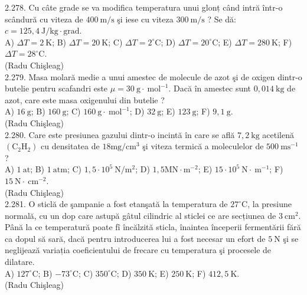 2.278. Cu câte grade se va modifica temperatura unui glonț când intră într-o scândură cu viteza de $400 \mathrm{~m} / \mathrm{s}$ şi iese cu viteza $300 \mathrm{~m} / \mathrm{s}$ ? Se dă: $c=125,4 \mathrm{~J} / \mathrm{kg} \cdot \mathrm{grad}$.\\ A) $\Delta T=2 \mathrm{~K}$; B) $\Delta T=20 \mathrm{~K}$; C) $\Delta T=2^{\circ} \mathrm{C}$; D) $\Delta T=20^{\circ} \mathrm{C}$; E) $\Delta T=280 \mathrm{~K}$; F) $\Delta T=28^{\circ} \mathrm{C}$.\\ (Radu Chişleag)\\

2.279. Masa molară medie a unui amestec de molecule de azot şi de oxigen dintr-o butelie pentru scafandri este $\mu=30 \mathrm{~g} \cdot \mathrm{~mol}^{-1}$. Dacă în amestec sunt $0,014 \mathrm{~kg}$ de azot, care este masa oxigenului din butelie ?\\ A) $16 \mathrm{~g}$; B) $160 \mathrm{~g}$; C) $160 \mathrm{~g} \cdot \mathrm{~mol}^{-1}$; D) $32 \mathrm{~g}$; E) $123 \mathrm{~g}$; F) $9,1 \mathrm{~g}$.\\ (Radu Chişleag)\\

2.280. Care este presiunea gazului dintr-o incintă în care se află $7,2 \mathrm{~kg}$ acetilenă $\left(\mathrm{C}_{2} \mathrm{H}_{2}\right)$ cu densitatea de $18 \mathrm{mg} / \mathrm{cm}^{3}$ şi viteza termică a moleculelor de $500 \mathrm{~ms}^{-1}$ ?\\ A) $1 \mathrm{~at}$; B) $1 \mathrm{~atm}$; C) $1,5 \cdot 10^{5} \mathrm{~N} / \mathrm{m}^{2}$; D) $1,5 \mathrm{MN} \cdot \mathrm{m}^{-2}$; E) $15 \cdot 10^{5} \mathrm{~N} \cdot \mathrm{~m}^{-1}$; F) $15 \mathrm{~N} \cdot \mathrm{~cm}^{-2}$.\\ (Radu Chişleag)\\

2.281. O sticlă de şampanie a fost etanşată la temperatura de $27^{\circ} \mathrm{C}$, la presiune normală, cu un dop care astupă gâtul cilindric al sticlei ce are secțiunea de $3 \mathrm{~cm}^{2}$. Până la ce temperatură poate fî încălzită sticla, înaintea începerii fermentării fără ca dopul să sară, dacă pentru introducerea lui a fost necesar un efort de $5 \mathrm{~N}$ şi se neglijează variația coeficientului de frecare cu temperatura şi procesele de dilatare.\\ A) $127^{\circ} \mathrm{C}$; B) $-73^{\circ} \mathrm{C}$; C) $350^{\circ} \mathrm{C}$; D) $350 \mathrm{~K}$; E) $250 \mathrm{~K}$; F) $412,5 \mathrm{~K}$.\\ (Radu Chişleag)\\

